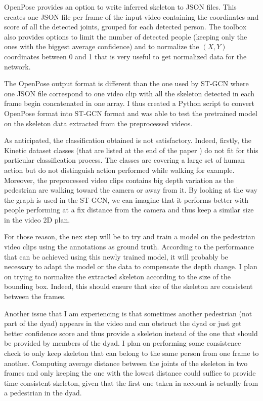 \documentclass[12pt,a4paper,twoside]{article}
\begin{document}
OpenPose provides an option to write inferred skeleton to JSON files. This creates one JSON file per frame of the input video containing the coordinates and score of all the detected joints, grouped for each detected person. The toolbox also provides options to limit the number of detected people (keeping only the ones with the biggest average confidence) and to normalize the $(X,Y)$ coordinates between 0 and 1 that is very useful to get normalized data for the network.

The OpenPose output format is different than the one used by ST-GCN where one JSON file correspond to one video clip with all the skeleton detected in each frame begin concatenated in one array. I thus created a Python script to convert OpenPose format into ST-GCN format and was able to test the pretrained model on the skeleton data extracted from the preprocessed videos.

As anticipated, the classification obtained is not satisfactory. Indeed, firstly, the Kinetic dataset classes (that are listed at the end of the paper \cite{Kay2017}) do not fit for this particular classification process. The classes are covering a large set of human action but do not distinguish action performed while walking for example. Moreover, the preprocessed video clips contains big depth variation as the pedestrian are walking toward the camera or away from it. By looking at the way the graph is used in the ST-GCN, we can imagine that it performs better with people performing at a fix distance from the camera and thus keep a similar size in the video 2D plan. 

For those reason, the nex step will be to try and train a model on the pedestrian video clips using the annotations as ground truth. According to the performance that can be achieved using this newly trained model, it will probably be necessary to adapt the model or the data to compensate the depth change. I plan on trying to normalize the extracted skeleton according to the size of the bounding box. Indeed, this should ensure that size of the skeleton are consistent between the frames.

Another issue that I am experiencing is that sometimes another pedestrian (not part of the dyad) appears in the video and can obstruct the dyad or just get better confidence score and thus provide a skeleton instead of the one that should be provided by members of the dyad. I plan on performing some consistence check to only keep skeleton that can belong to the same person from one frame to another. Computing average distance between the joints of the skeleton in two frames and only keeping the one with the lowest distance could suffice to provide time consistent skeleton, given that the first one taken in account is actually from a pedestrian in the dyad. 
\end{document}
